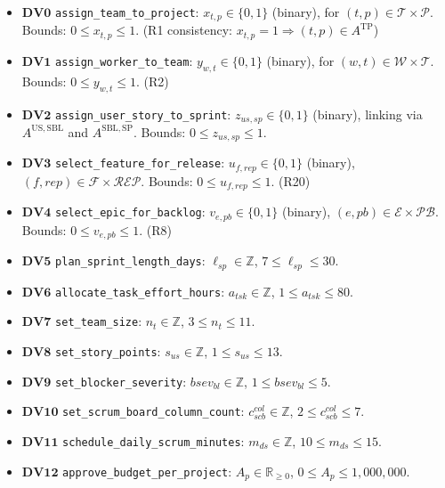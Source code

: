 \documentclass[11pt,a4paper]{article}
\begin{document}
\begin{itemize}[leftmargin=2em]
  \item \(\mathbf{DV0}\) \texttt{assign\_team\_to\_project}: \(x_{t,p}\in\{0,1\}\) (binary), for \((t,p)\in\mathcal{T}\times\mathcal{P}\). Bounds: \(0\le x_{t,p}\le 1\). (R1 consistency: \(x_{t,p}=1\Rightarrow (t,p)\in A^{\mathrm{TP}}\))
  \item \(\mathbf{DV1}\) \texttt{assign\_worker\_to\_team}: \(y_{w,t}\in\{0,1\}\) (binary), for \((w,t)\in\mathcal{W}\times\mathcal{T}\). Bounds: \(0\le y_{w,t}\le 1\). (R2)
  \item \(\mathbf{DV2}\) \texttt{assign\_user\_story\_to\_sprint}: \(z_{us,sp}\in\{0,1\}\) (binary), linking via \(A^{\mathrm{US,SBL}}\) and \(A^{\mathrm{SBL,SP}}\). Bounds: \(0\le z_{us,sp}\le 1\).
  \item \(\mathbf{DV3}\) \texttt{select\_feature\_for\_release}: \(u_{f,rep}\in\{0,1\}\) (binary), \((f,rep)\in\mathcal{F}\times\mathcal{REP}\). Bounds: \(0\le u_{f,rep}\le 1\). (R20)
  \item \(\mathbf{DV4}\) \texttt{select\_epic\_for\_backlog}: \(v_{e,pb}\in\{0,1\}\) (binary), \((e,pb)\in\mathcal{E}\times\mathcal{PB}\). Bounds: \(0\le v_{e,pb}\le 1\). (R8)
  \item \(\mathbf{DV5}\) \texttt{plan\_sprint\_length\_days}: \(\ell_{sp}\in\mathbb{Z}\), \(7\le \ell_{sp}\le 30\).
  \item \(\mathbf{DV6}\) \texttt{allocate\_task\_effort\_hours}: \(a_{tsk}\in\mathbb{Z}\), \(1\le a_{tsk}\le 80\).
  \item \(\mathbf{DV7}\) \texttt{set\_team\_size}: \(n_{t}\in\mathbb{Z}\), \(3\le n_{t}\le 11\).
  \item \(\mathbf{DV8}\) \texttt{set\_story\_points}: \(s_{us}\in\mathbb{Z}\), \(1\le s_{us}\le 13\).
  \item \(\mathbf{DV9}\) \texttt{set\_blocker\_severity}: \(bsev_{bl}\in\mathbb{Z}\), \(1\le bsev_{bl}\le 5\).
  \item \(\mathbf{DV10}\) \texttt{set\_scrum\_board\_column\_count}: \(c^{col}_{scb}\in\mathbb{Z}\), \(2\le c^{col}_{scb}\le 7\).
  \item \(\mathbf{DV11}\) \texttt{schedule\_daily\_scrum\_minutes}: \(m_{ds}\in\mathbb{Z}\), \(10\le m_{ds}\le 15\).
  \item \(\mathbf{DV12}\) \texttt{approve\_budget\_per\_project}: \(A_{p}\in\mathbb{R}_{\ge 0}\), \(0\le A_{p}\le 1{,}000{,}000\).
\end{itemize}
\end{document}
